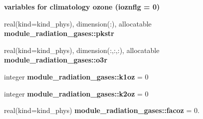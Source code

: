 \begin{Indent}\textbf{ variables for climatology ozone (ioznflg = 0)}\par
\begin{DoxyCompactItemize}
\item 
real(kind=kind\+\_\+phys), dimension(\+:), allocatable {\bfseries module\+\_\+radiation\+\_\+gases\+::pkstr}
\item 
real(kind=kind\+\_\+phys), dimension(\+:,\+:,\+:), allocatable {\bfseries module\+\_\+radiation\+\_\+gases\+::o3r}
\item 
integer {\bfseries module\+\_\+radiation\+\_\+gases\+::k1oz} = 0
\item 
integer {\bfseries module\+\_\+radiation\+\_\+gases\+::k2oz} = 0
\item 
real(kind=kind\+\_\+phys) {\bfseries module\+\_\+radiation\+\_\+gases\+::facoz} = 0.
\end{DoxyCompactItemize}
\end{Indent}
